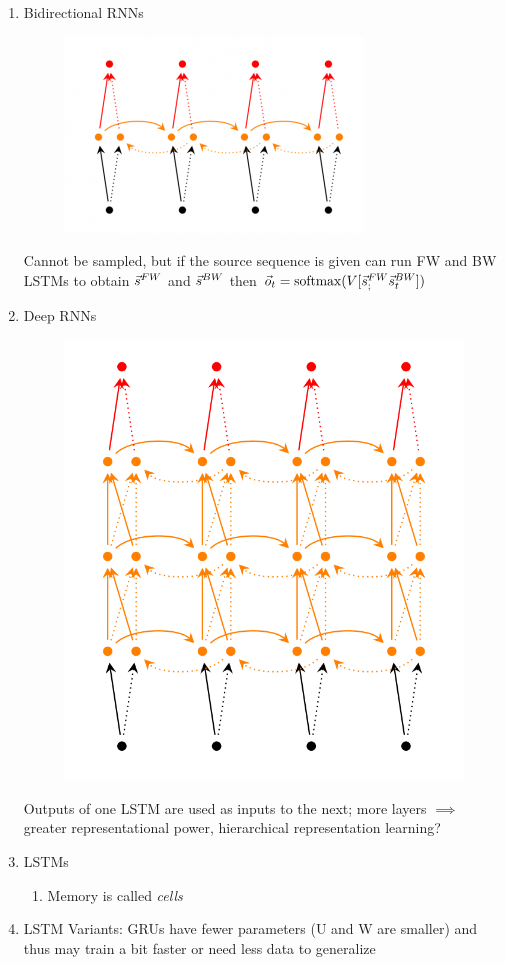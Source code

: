 \begin{enumerate}
    \item Bidirectional RNNs
        \begin{figure}[htpb]
            \centering
            \includegraphics[width=0.8\linewidth]{Figures/bi-rnn.png}
            \caption{}
        \end{figure}
        Cannot be sampled, but if the source sequence is given can run FW and BW LSTMs
        to obtain $\vec{s}^{FW}$ and $\vec{s}^{BW}$ then $\vec{o}_t = \operatorname*{softmax}(V [\vec{s}^{FW}_; \vec{s}^{BW}_t])$
    \item Deep RNNs
        \begin{figure}[htpb]
            \centering
            \includegraphics[width=0.8\linewidth]{Figures/deep-rnn.png}
            \caption{}
        \end{figure}
        Outputs of one LSTM are used as inputs to the next; more layers $\implies$
        greater representational power, hierarchical representation learning?
    \item LSTMs
        \begin{enumerate}
            \item Memory is called \emph{cells}
        \end{enumerate}

    \item LSTM Variants: GRUs have fewer parameters (U and W are smaller) and
        thus may train a bit faster or need less data to generalize
\end{enumerate}

